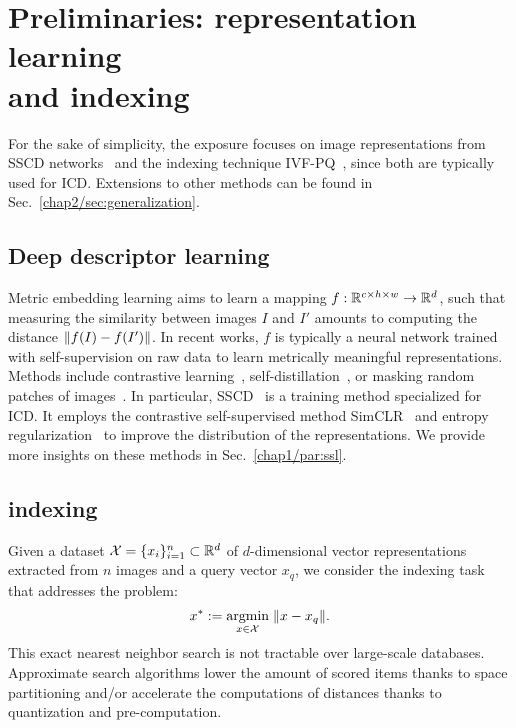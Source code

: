 \newcommand{\nprobe}{{k'}}
\def\qivf{q_\mathrm{c}}
\newcommand{\qcompressed}{q_\mathrm{f}}








\section[Preliminaries: representation learning and indexing]{Preliminaries: representation learning \\and indexing}


For the sake of simplicity, the exposure focuses on image representations from SSCD networks~\citep{pizzi2022sscd} and the indexing technique IVF-PQ~\citep{jegou2010pq}, since both are typically used for ICD.
Extensions to other methods can be found in Sec.~\ref{chap2/sec:generalization}.


\subsection{Deep descriptor learning}

Metric embedding learning aims to learn a mapping $f: \mathbb{R}^{c\times h\times w} \to \mathbb{R}^d$, such that measuring the similarity between images $I$ and $I'$ amounts to computing the distance $\lVert{f(I) - f(I')}\rVert$. 
In recent works, $f$ is typically a neural network trained with self-supervision on raw data to learn metrically meaningful representations.
Methods include contrastive learning~\citep{chen2020simclr}, self-distillation~\citep{grill2020bootstrap, caron2021dino}, or masking random patches of images~\citep{he2022masked, assran2022masked}.
In particular, SSCD~\citep{pizzi2022sscd} is a training method specialized for ICD.
It employs the contrastive self-supervised method SimCLR~\citep{chen2020simclr} and entropy regularization~\citep{sablayrolles2018catalyser} to improve the distribution of the representations.
We provide more insights on these methods in Sec.~\ref{chap1/par:ssl}.

\subsection{\Gls*{indexing}}
Given a dataset $\mathcal X = \{x_i\}_{i=1}^{n}\subset \mathbb{R}^d$ of $d$-dimensional vector representations extracted from $n$ images and a query vector $x_q$, we consider the indexing task that addresses the problem: 
\begin{align}
    x^* := \mathop{\mathrm{argmin}}_{x \in \mathcal X} 
    \;  \lVert{x - x_q}\rVert.  
\end{align}
This exact nearest neighbor search is not tractable over large-scale databases.
Approximate search algorithms lower the amount of scored items thanks to space partitioning and/or accelerate the computations of distances thanks to quantization and pre-computation. 

